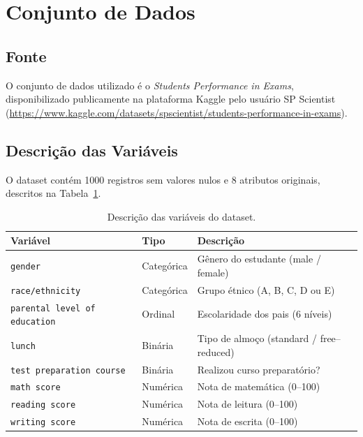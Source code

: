 \documentclass[12pt, a4paper]{article}
\begin{document}
\section{Conjunto de Dados}

\subsection{Fonte}

O conjunto de dados utilizado é o \textit{Students Performance in Exams},
disponibilizado publicamente na plataforma Kaggle pelo usuário SP Scientist
(\url{https://www.kaggle.com/datasets/spscientist/students-performance-in-exams}).

\subsection{Descrição das Variáveis}

O dataset contém 1000 registros sem valores nulos e 8
atributos originais, descritos na Tabela~\ref{tab:variaveis}.

\begin{table}[H]
  \centering
  \caption{Descrição das variáveis do dataset.}
  \label{tab:variaveis}
  \begin{tabular}{lll}
    \toprule
    \textbf{Variável} & \textbf{Tipo} & \textbf{Descrição} \\
    \midrule
    \texttt{gender}                      & Categórica & Gênero do estudante (male / female) \\
    \texttt{race/ethnicity}              & Categórica & Grupo étnico (A, B, C, D ou E) \\
    \texttt{parental level of education} & Ordinal    & Escolaridade dos pais (6 níveis) \\
    \texttt{lunch}                       & Binária    & Tipo de almoço (standard / free--reduced) \\
    \texttt{test preparation course}     & Binária    & Realizou curso preparatório? \\
    \texttt{math score}                  & Numérica   & Nota de matemática (0--100) \\
    \texttt{reading score}               & Numérica   & Nota de leitura (0--100) \\
    \texttt{writing score}               & Numérica   & Nota de escrita (0--100) \\
    \bottomrule
  \end{tabular}
\end{table}
\end{document}
